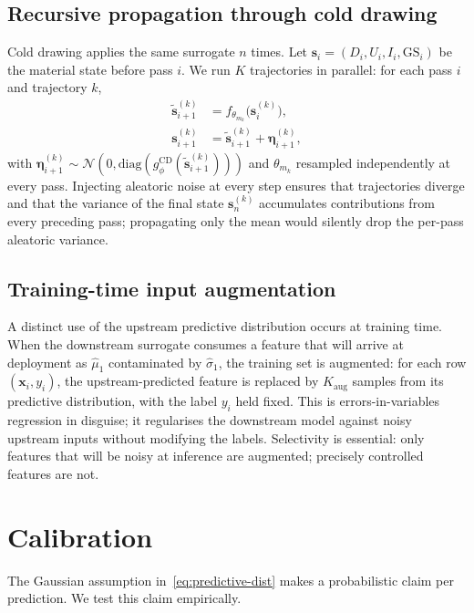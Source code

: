 \documentclass[conference]{IEEEtran}
\begin{document}
\subsection{Recursive propagation through cold drawing}

Cold drawing applies the same surrogate $n$ times. Let $\bm s_i = (D_i, U_i, I_i, \mathrm{GS}_i)$ be the material state before pass $i$. We run $K$ trajectories in parallel: for each pass $i$ and trajectory $k$,
\begin{align}
\tilde{\bm s}_{i+1}^{(k)} &= f_{\theta_{m_k}}\!\big(\bm s_i^{(k)}\big),\\
\bm s_{i+1}^{(k)} &= \tilde{\bm s}_{i+1}^{(k)} + \bm\eta_{i+1}^{(k)},
\end{align}
with $\bm\eta_{i+1}^{(k)} \sim \mathcal{N}(0, \mathrm{diag}(g_\phi^{\text{CD}}(\tilde{\bm s}_{i+1}^{(k)})))$ and $\theta_{m_k}$ resampled independently at every pass. Injecting aleatoric noise at every step ensures that trajectories diverge and that the variance of the final state $\bm s_n^{(k)}$ accumulates contributions from every preceding pass; propagating only the mean would silently drop the per-pass aleatoric variance.

\subsection{Training-time input augmentation}

A distinct use of the upstream predictive distribution occurs at training time. When the downstream surrogate consumes a feature that will arrive at deployment as $\hat\mu_1$ contaminated by $\hat\sigma_1$, the training set is augmented: for each row $(\bm x_i, y_i)$, the upstream-predicted feature is replaced by $K_{\text{aug}}$ samples from its predictive distribution, with the label $y_i$ held fixed. This is errors-in-variables regression in disguise; it regularises the downstream model against noisy upstream inputs without modifying the labels. Selectivity is essential: only features that will be noisy at inference are augmented; precisely controlled features are not.

\section{Calibration}
\label{sec:calibration}

The Gaussian assumption in~\eqref{eq:predictive-dist} makes a probabilistic claim per prediction. We test this claim empirically.
\end{document}
